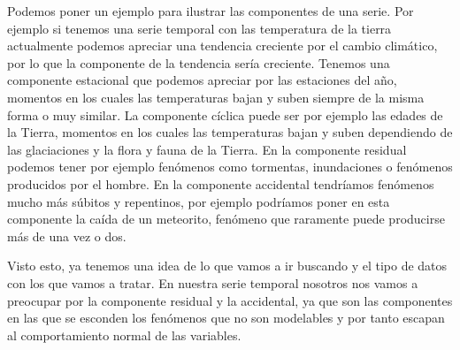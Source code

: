 Podemos poner un ejemplo para ilustrar las componentes de una serie. Por ejemplo si tenemos una serie temporal con las temperatura de la tierra actualmente podemos apreciar una tendencia creciente por el cambio climático, por lo que la componente de la tendencia sería creciente. Tenemos una componente estacional que podemos apreciar por las estaciones del año, momentos en los cuales las temperaturas bajan y suben siempre de la misma forma o muy similar. La componente cíclica puede ser por ejemplo las edades de la Tierra, momentos en los cuales las temperaturas bajan y suben dependiendo de las glaciaciones y la flora y fauna de la Tierra. En la componente residual podemos tener por ejemplo fenómenos como tormentas, inundaciones o fenómenos producidos por el hombre. En la componente accidental tendríamos fenómenos mucho más súbitos y repentinos, por ejemplo podríamos poner en esta componente la caída de un meteorito, fenómeno que raramente puede producirse más de una vez o dos.

Visto esto, ya tenemos una idea de lo que vamos a ir buscando y el tipo de datos con los que vamos a tratar. En nuestra serie temporal nosotros nos vamos a preocupar por la componente residual y la accidental, ya que son las componentes en las que se esconden los fenómenos que no son modelables y por tanto escapan al comportamiento normal de las variables.